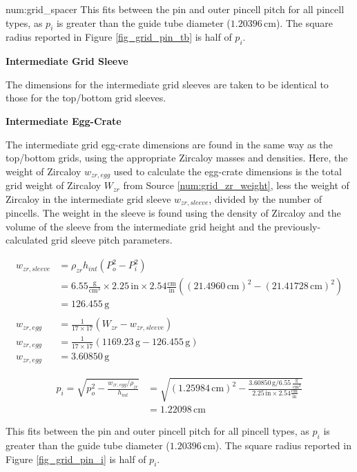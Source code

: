 \begin{numitem}{num:grid_spacer}
  This fits between the pin and outer pincell pitch for all pincell types, as
  $p_i$ is greater than the guide tube diameter ($1.20396\,\mathrm{cm}$). The
  square radius reported in Figure \ref{fig_grid_pin_tb} is half of $p_i$.
  
  \textbf{Intermediate Grid Sleeve}
  
  The dimensions for the intermediate grid sleeves are taken to be identical to
  those for the top/bottom grid sleeves.
  
  \textbf{Intermediate Egg-Crate}
  
  The intermediate grid egg-crate dimensions are found in the same way as the
  top/bottom grids, using the appropriate Zircaloy masses and densities. Here,
  the weight of Zircaloy $w_{zr,egg}$ used to calculate the egg-crate dimensions
  is the total grid weight of Zircaloy $W_{zr}$ from Source
  \ref{num:grid_zr_weight}, less the weight of Zircaloy in the intermediate grid
  sleeve $w_{zr,sleeve}$, divided by the number of pincells. The weight in the
  sleeve is found using the density of Zircaloy and the volume of the sleeve
  from the intermediate grid height and the previously-calculated grid sleeve
  pitch parameters.

\[
  \begin{aligned}
    w_{zr,sleeve} &= \rho_{zr} h_{int} \left(P_o^2 - P_i^2\right) \\
                  &= 6.55 \mathrm{\frac{g}{cm^3}}\times2.25\,\mathrm{in}\times2.54\mathrm{\frac{cm}{in}}\left((21.4960\,\mathrm{cm})^2 - (21.41728\,\mathrm{cm})^2\right)\\
                  &= 126.455\,\mathrm{g}\\
                  \\
    w_{zr,egg}    &= \frac{1}{17\times17}\left ( W_{zr} - w_{zr,sleeve}\right) \\
    w_{zr,egg}    &= \frac{1}{17\times17}\left ( 1169.23\,\mathrm{g} - 126.455\,\mathrm{g}\right) \\
    w_{zr,egg}    &= 3.60850\,\mathrm{g}
  \end{aligned}
\]

\[
  \begin{aligned}
    p_i = \sqrt{p_o^2 - \frac{w_{zr,egg}/\rho_{zr}}{h_{int}}} &=
          \sqrt{(1.25984\,\mathrm{cm})^2 -
          \frac{3.60850\,\mathrm{g}/6.55\,\frac{\mathrm{g}}{\mathrm{cm}^3}}{2.25\,
          \mathrm{in}\times2.54\mathrm{\frac{cm}{in}}}} \\
        & = 1.22098\,\mathrm{cm}
  \end{aligned}
\]

  This fits between the pin and outer pincell pitch for all pincell types, as
  $p_i$ is greater than the guide tube diameter ($1.20396\,\mathrm{cm}$). The
  square radius reported in Figure \ref{fig_grid_pin_i} is half of $p_i$.


\end{numitem}

